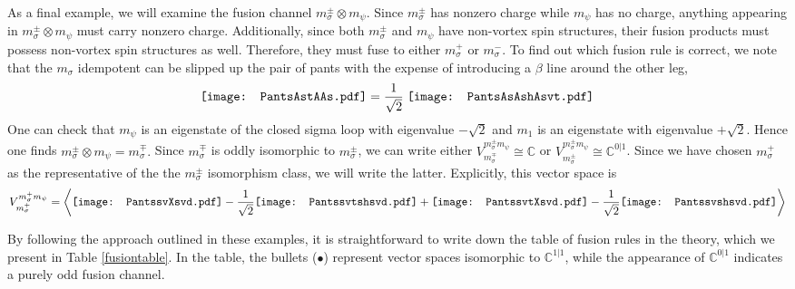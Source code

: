 \documentclass[12pt,a4paper]{article}
\newcommand{\tp}{\otimes}
\newcommand{\cc}{\mathbb{C}}
\newcommand{\PantsAsAshAsvt}{\mathord{\vcenter{\hbox{\texttt{[image: PantsAsAshAsvt.pdf]}}}}}
\newcommand{\PantsAstAAs}{\mathord{\vcenter{\hbox{\texttt{[image: PantsAstAAs.pdf]}}}}}
\newcommand{\PantssvtXsvd}{\mathord{\vcenter{\hbox{\texttt{[image: PantssvtXsvd.pdf]}}}}}
\newcommand{\Pantssvtshsvd}{\mathord{\vcenter{\hbox{\texttt{[image: Pantssvtshsvd.pdf]}}}}}
\newcommand{\Pantssvshsvd}{\mathord{\vcenter{\hbox{\texttt{[image: Pantssvshsvd.pdf]}}}}}
\newcommand{\PantssvXsvd}{\mathord{\vcenter{\hbox{\texttt{[image: PantssvXsvd.pdf]}}}}}
\begin{document}
As a final example, we will examine the fusion channel $m_\sigma^{\pm} \tp m_\psi$. 
Since $m_\sigma^{\pm}$ has nonzero charge while $m_\psi$ has no charge, anything appearing in $m_\sigma^\pm \tp m_\psi$ must carry nonzero charge. Additionally, since both $m_\sigma^\pm$ and $m_\psi$ have non-vortex spin structures, their fusion products must possess non-vortex spin structures as well. Therefore, they must fuse to either $m_\sigma^+$ or $m_\sigma^-$. To find out which fusion rule is correct, we note that the $m_\sigma$ idempotent can be slipped up the pair of pants with the expense of introducing a $\beta$ line around the other leg,
\begin{align}
\PantsAstAAs  = \frac{1}{\sqrt{2}} \;  \PantsAsAshAsvt
\end{align}
One can check that $m_\psi$ is an eigenstate of the closed sigma loop with eigenvalue $-\sqrt{2}$ and $m_1$ is an eigenstate with eigenvalue $+\sqrt{2}$. Hence one finds $m_\sigma^{\pm} \tp m_\psi  = m_\sigma^{\mp}.$ Since $m^\mp_\sigma$ is oddly isomorphic to $m_\sigma^\pm$, we can write either $V^{m_\sigma^\pm m_\psi}_{m_\sigma^\mp} \cong \cc$ or $V^{m_\sigma^\pm m_\psi}_{m_\sigma^\pm} \cong \cc^{0|1}$. 
Since we have chosen $m_\sigma^+$ as the representative of the the $m_\sigma^\pm$ isomorphism class, we will write the latter.
Explicitly, this vector space is
\begin{align}
V^{m_\sigma^+ m_\psi}_{m_\sigma^+} = \left\langle \PantssvXsvd -\frac{1}{\sqrt{2}}\Pantssvtshsvd + \PantssvtXsvd  - \frac{1}{\sqrt{2}} \Pantssvshsvd   \right \rangle 
\end{align}


By following the approach outlined in these examples, it is straightforward to write down the table of fusion rules in the theory, which we present in Table \ref{fusiontable}. In the table, the bullets ($\bullet$) represent vector spaces isomorphic to $\cc^{1|1}$, while the appearance of $\cc^{0|1}$ indicates a purely odd fusion channel. 
\end{document}
